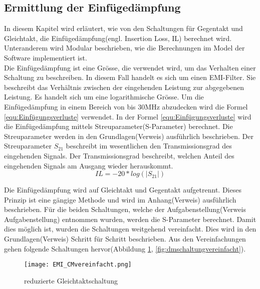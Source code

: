 \subsection{Ermittlung der Einfügedämpfung} \label{subsec:ermittlung}
In diesem Kapitel wird erläutert, wie von den Schaltungen für Gegentakt und Gleichtakt, die Einfügedämpfung(engl. Insertion Loss, IL) berechnet wird. Unteranderem wird Modular beschrieben, wie die Berechnungen im Model der Software implementiert ist. \\

Die Einfügedämpfung ist eine Grösse, die verwendet wird, um das Verhalten einer Schaltung zu beschreiben. In diesem Fall handelt es sich um einen EMI-Filter. Sie beschreibt das Verhältnis zwischen der eingehenden Leistung zur abgegebenen Leistung. Es handelt sich um eine logarithmische Grösse. Um die Einfügedämpfung in einem Bereich von bis 30MHz abzudecken wird die Formel \ref{equ:Einfügungsverluste} verwendet. In der Formel \ref{equ:Einfügungsverluste} wird die Einfügedämpfung mittels Streuparameter(S-Parameter) berechnet. Die Streuparameter werden in den Grundlagen(Verweis) ausführlich beschrieben. Der Streuparameter $S_{21}$ beschreibt im wesentlichen den Transmissionsgrad des eingehenden Signals. Der Transmissionsgrad beschreibt, welchen Anteil des eingehenden Signals am Ausgang wieder herauskommt.\\

\begin{equation}\label{equ:Einfügungsverluste}
	IL = -20*log (\left\lvert S_{21} \right\rvert)
\end{equation}

Die Einfügedämpfung wird auf Gleichtakt und Gegentakt aufgetrennt. Dieses Prinzip ist eine gängige Methode und wird im Anhang(Verweis) ausführlich beschrieben. Für die beiden Schaltungen, welche der Aufgabenstellung(Verweis Aufgabenstellung) entnommen wurden, werden die S-Parameter berechnet. Damit dies möglich ist, wurden die Schaltungen weitgehend vereinfacht. Dies wird in den Grundlagen(Verweis) Schritt für Schritt beschrieben. Aus den Vereinfachungen gehen folgende Schaltungen hervor(Abbildung \ref{fig:cmschaltungvereinfacht}, \ref{fig:dmschaltungvereinfacht}).

\begin{figure}[H]
		\centering
		\texttt{[image: EMI\_CMvereinfacht.png]}
		\label{fig:cmschaltungvereinfacht}
		\caption{reduzierte Gleichtaktschaltung}
\end{figure}

